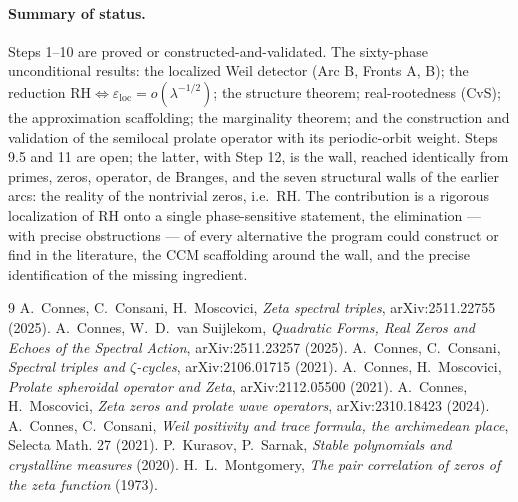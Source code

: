 \documentclass[11pt]{article}
\theoremstyle{remark}
\newcommand{\ve}{\varepsilon}
\newcommand{\loc}{\mathrm{loc}}
\begin{document}
\paragraph{Summary of status.} Steps 1--10 are proved or constructed-and-validated. The
sixty-phase unconditional results: the localized Weil detector (Arc B, Fronts A, B); the
reduction $\mathrm{RH}\iff\ve_\loc=o(\lambda^{-1/2})$; the structure theorem; real-rootedness
(CvS); the approximation scaffolding; the marginality theorem; and the construction and
validation of the semilocal prolate operator with its periodic-orbit weight. Steps 9.5 and 11
are open; the latter, with Step 12, is the wall, reached identically from primes, zeros,
operator, de Branges, and the seven structural walls of the earlier arcs: the reality of the
nontrivial zeros, i.e.\ RH. The contribution is a rigorous localization of RH onto a single
phase-sensitive statement, the elimination --- with precise obstructions --- of every
alternative the program could construct or find in the literature, the CCM scaffolding around
the wall, and the precise identification of the missing ingredient.

\begin{thebibliography}{9}
 A.~Connes, C.~Consani, H.~Moscovici, \emph{Zeta spectral triples}, arXiv:2511.22755 (2025).
 A.~Connes, W.~D.~van Suijlekom, \emph{Quadratic Forms, Real Zeros and Echoes of the Spectral Action}, arXiv:2511.23257 (2025).
 A.~Connes, C.~Consani, \emph{Spectral triples and $\zeta$-cycles}, arXiv:2106.01715 (2021).
 A.~Connes, H.~Moscovici, \emph{Prolate spheroidal operator and Zeta}, arXiv:2112.05500 (2021).
 A.~Connes, H.~Moscovici, \emph{Zeta zeros and prolate wave operators}, arXiv:2310.18423 (2024).
 A.~Connes, C.~Consani, \emph{Weil positivity and trace formula, the archimedean place}, Selecta Math. 27 (2021).
 P.~Kurasov, P.~Sarnak, \emph{Stable polynomials and crystalline measures} (2020).
 H.~L.~Montgomery, \emph{The pair correlation of zeros of the zeta function} (1973).
\end{thebibliography}
\end{document}
